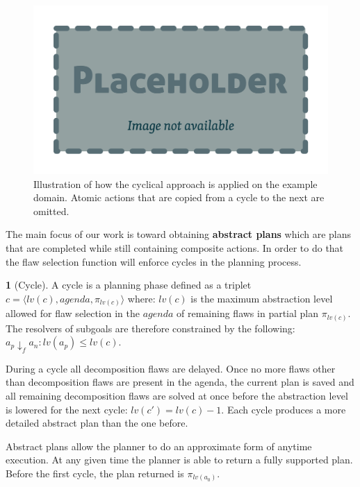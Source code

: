 \documentclass[11pt,a4paper,twoside,openright,titlepage,numbers=noenddot,headinclude,cleardoublepage=empty,openany]{scrreprt}
\theoremstyle{plain}
\theoremstyle{definition}
\newtheorem{definition}{\capitalisewords{definition}}[]
\theoremstyle{remark}
\begin{document}
\begin{figure}
\hypertarget{fig:cycles}{%
\centering
\includegraphics{./tex2pdf.-0b80fea6fd6da7f9/85c5abcb21612ede4db12ac6fcfd32ed24ed57eb.pdf}
\caption{Illustration of how the cyclical approach is applied on the
example domain. Atomic actions that are copied from a cycle to the next
are omitted.}\label{fig:cycles}
}
\end{figure}

The main focus of our work is toward obtaining \textbf{abstract plans}
which are plans that are completed while still containing composite
actions. In order to do that the flaw selection function will enforce
cycles in the planning process.

\begin{definition}[Cycle]

A cycle is a planning phase defined as a triplet
\(c = \langle lv(c), agenda, \pi_{lv(c)}\rangle\) where: \(lv(c)\) is
the maximum abstraction level allowed for flaw selection in the
\(agenda\) of remaining flaws in partial plan \(\pi_{lv(c)}\). The
resolvers of subgoals are therefore constrained by the following:
\(a_p \downarrow_f a_n: lv(a_p) \leq lv(c)\).

\end{definition}

During a cycle all decomposition flaws are delayed. Once no more flaws
other than decomposition flaws are present in the agenda, the current
plan is saved and all remaining decomposition flaws are solved at once
before the abstraction level is lowered for the next cycle:
\(lv(c') = lv(c)-1\). Each cycle produces a more detailed abstract plan
than the one before.

Abstract plans allow the planner to do an approximate form of anytime
execution. At any given time the planner is able to return a fully
supported plan. Before the first cycle, the plan returned is
\(\pi_{lv(a_0)}\).
\end{document}
